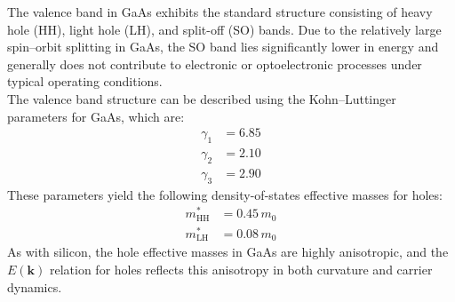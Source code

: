 The valence band in GaAs exhibits the standard structure consisting of heavy hole (HH), light hole (LH), and split-off (SO) bands. Due to the relatively large spin–orbit splitting in GaAs, the SO band lies significantly lower in energy and generally does not contribute to electronic or optoelectronic processes under typical operating conditions.\\
The valence band structure can be described using the Kohn–Luttinger parameters for GaAs, which are:
\begin{align*}
	\gamma_1 & = 6.85 \\
	\gamma_2 & = 2.10 \\
	\gamma_3 & = 2.90
\end{align*}
These parameters yield the following density-of-states effective masses for holes:
\begin{align*}
	m^*_{\text{HH}} & = 0.45\, m_0 \\
	m^*_{\text{LH}} & = 0.08\, m_0
\end{align*}
As with silicon, the hole effective masses in GaAs are highly anisotropic, and the \( E(\mathbf{k}) \) relation for holes reflects this anisotropy in both curvature and carrier dynamics.
